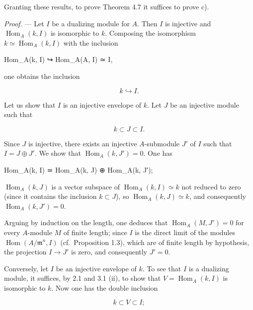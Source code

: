 \documentclass[
  11pt,
  a4paper,
]{book}
\newenvironment{Shaded}{}{}
\newcommand{\NormalTok}[1]{#1}
\begin{document}
Granting these results, to prove Theorem 4.7 it suffices to prove c).

\emph{Proof.} --- Let \(I\) be a dualizing module for \(A\). Then \(I\)
is injective and \(\operatorname{Hom}_{A}(k, I)\) is isomorphic to
\(k\). Composing the isomorphism
\(k \simeq \operatorname{Hom}_{A}(k, I)\) with the inclusion

\begin{Shaded}
\begin{Highlighting}[]
\NormalTok{Hom\_A(k, I) ↪ Hom\_A(A, I) ≃ I,}
\end{Highlighting}
\end{Shaded}

one obtains the inclusion

\[ k \hookrightarrow I. \]

Let us show that \(I\) is an injective envelope of \(k\). Let \(J\) be
an injective module such that

\[ k \subset J \subset I. \]

Since \(J\) is injective, there exists an injective \(A\)-submodule
\(J'\) of \(I\) such that \(I = J \oplus J'\). We show that
\(\operatorname{Hom}_{A}(k, J') = 0\). One has

\begin{Shaded}
\begin{Highlighting}[]
\NormalTok{Hom\_A(k, I) ≃ Hom\_A(k, J) ⊕ Hom\_A(k, J′);}
\end{Highlighting}
\end{Shaded}

\(\operatorname{Hom}_{A}(k, J)\) is a vector subspace of
\(\operatorname{Hom}_{A}(k, I) \simeq k\) not reduced to zero (since it
contains the inclusion \(k \subset J\)), so
\(\operatorname{Hom}_{A}(k, J) \simeq k\), and consequently
\(\operatorname{Hom}_{A}(k, J') = 0\).

Arguing by induction on the length, one deduces that
\(\operatorname{Hom}_{A}(M, J') = 0\) for every \(A\)-module \(M\) of
finite length; since \(I\) is the direct limit of the modules
\(\operatorname{Hom}(A/\mathfrak{m}^{n}, I)\) (cf.~Proposition 1.3),
which are of finite length by hypothesis, the projection \(I \to J'\) is
zero, and consequently \(J' = 0\).

Conversely, let \(I\) be an injective envelope of \(k\). To see that
\(I\) is a dualizing module, it suffices, by 2.1 and 3.1 (ii), to show
that \(V = \operatorname{Hom}_{A}(k, I)\) is isomorphic to \(k\). Now
one has the double inclusion

\[ k \subset V \subset I; \]
\end{document}
